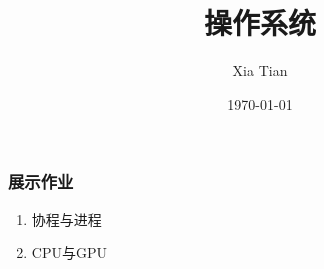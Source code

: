 \documentclass[table, t,13pt]{beamer}
\begin{document}
  \title{操作系统}
  \author{Xia Tian }
  \date{\today{}}

  \frame{\titlepage}

%
%

%
%
%

\begin{frame}[fragile]
  \frametitle{展示作业}
  \begin{enumerate}
  \item 协程与进程
  \item CPU与GPU
  \end{enumerate}
\end{frame}
\end{document}
